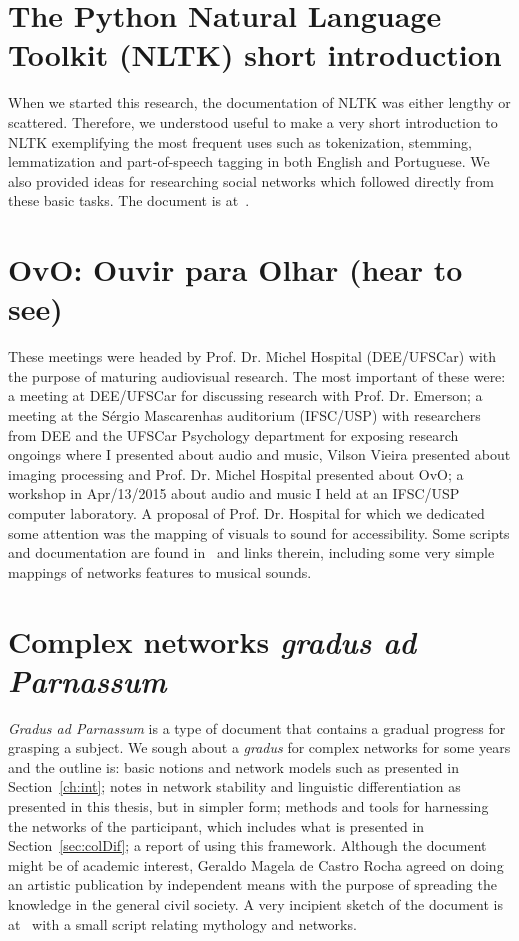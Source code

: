 \begin{apendicesenv}
\section{The Python Natural Language Toolkit (NLTK) short introduction}
When we started this research, the documentation of NLTK was either lengthy or
scattered.
Therefore, we understood useful to make a very short introduction to NLTK
exemplifying the most frequent uses such as tokenization, stemming, lemmatization and
part-of-speech tagging in both English and Portuguese.
We also provided ideas for researching social networks which followed directly from
these basic tasks.
The document is at~\cite{trabNLTK}.


\section{OvO: Ouvir para Olhar (hear to see)}
These meetings were headed by Prof. Dr. Michel Hospital (DEE/UFSCar)
with the purpose of maturing audiovisual research.
The most important of these were: a meeting at DEE/UFSCar for discussing research with Prof. Dr. Emerson;
a meeting at the Sérgio Mascarenhas auditorium (IFSC/USP) with researchers from DEE and the UFSCar Psychology department
for exposing research ongoings where I presented about audio and music, Vilson Vieira presented about imaging processing
and Prof. Dr. Michel Hospital presented about OvO;
a workshop in Apr/13/2015 about audio and music I held at an IFSC/USP computer laboratory.
A proposal of Prof. Dr. Hospital for which we dedicated some attention was the
mapping of visuals to sound for accessibility.
Some scripts and documentation are found in~\cite{ovo} and links therein,
including some very simple mappings of networks features to musical sounds.

\section{Complex networks \emph{gradus ad Parnassum}}
\emph{Gradus ad Parnassum} is a type of document that contains a gradual progress for grasping a subject.
We sough about a \emph{gradus} for complex networks for some years and the outline is:
basic notions and network models such as presented in Section~\ref{ch:int};
notes in network stability and linguistic differentiation as presented in this thesis, but in simpler form;
methods and tools for harnessing the networks of the participant, which includes what is presented in Section~\ref{sec:colDif};
a report of using this framework.
Although the document might be of academic interest,
Geraldo Magela de Castro Rocha agreed on doing an artistic publication by independent means
with the purpose of spreading the knowledge in the general civil society.
A very incipient sketch of the document is at~\cite{gradus}
with a small script relating mythology and networks.


\end{apendicesenv}
